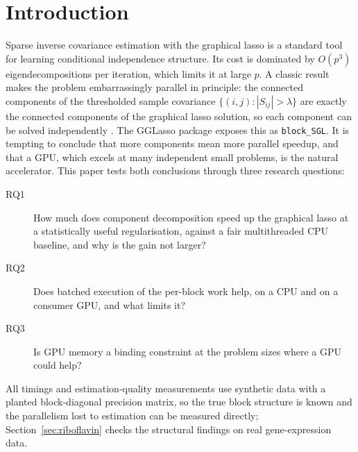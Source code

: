 \documentclass[pdflatex,sn-mathphys-num]{sn-jnl}
\begin{document}
\section{Introduction}
Sparse inverse covariance estimation with the graphical lasso
\cite{friedman2008,banerjee2008} is a standard tool for learning conditional
independence structure. Its cost is dominated by $O(p^3)$
eigendecompositions per iteration, which limits it at large $p$.
A classic result makes the problem embarrassingly parallel in principle:
the connected components of the thresholded sample covariance
$\{(i,j): |S_{ij}|>\lambda\}$ are exactly the connected components of the
graphical lasso solution, so each component can be solved independently
\cite{witten2011,mazumder2012}. The GGLasso package \cite{gglasso2021} exposes
this as \texttt{block\_SGL}.
It is tempting to conclude that more components mean more parallel speedup,
and that a GPU, which excels at many independent small problems, is the
natural accelerator. This paper tests both conclusions through three
research questions:
\begin{description}
\item[RQ1] How much does component decomposition speed up the graphical lasso
 at a statistically useful regularisation, against a fair multithreaded CPU
 baseline, and why is the gain not larger?
\item[RQ2] Does batched execution of the per-block work help, on a CPU and on
 a consumer GPU, and what limits it?
\item[RQ3] Is GPU memory a binding constraint at the problem sizes where a GPU
 could help?
\end{description}
All timings and estimation-quality measurements use synthetic data with a
planted block-diagonal precision matrix, so the true block structure is known
and the parallelism lost to estimation can be measured directly;
Section~\ref{sec:riboflavin} checks the structural findings on real
gene-expression data.
\end{document}
